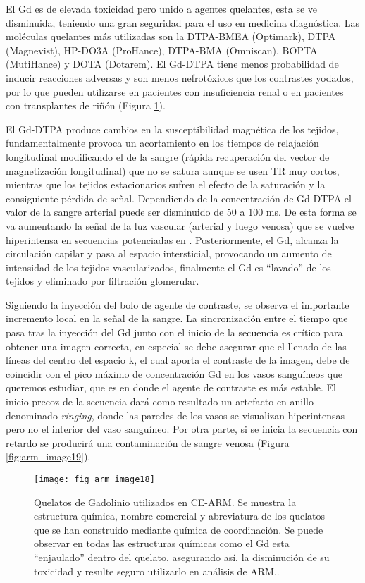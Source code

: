 El Gd es de elevada toxicidad pero unido a agentes quelantes, esta se ve disminuida, teniendo una gran seguridad para el uso en medicina diagnóstica. Las moléculas quelantes más utilizadas son la DTPA-BMEA (Optimark), DTPA (Magnevist), HP-DO3A (ProHance), DTPA-BMA (Omniscan), BOPTA (MutiHance) y DOTA (Dotarem). El Gd-DTPA tiene menos probabilidad de inducir reacciones adversas y son menos nefrotóxicos que los contrastes yodados, por lo que pueden utilizarse en pacientes con insuficiencia renal o en pacientes con transplantes de riñón (Figura \ref{fig:arm_image18}). 


El Gd-DTPA produce cambios en la susceptibilidad magnética de los tejidos, fundamentalmente provoca un acortamiento en los tiempos de relajación longitudinal modificando el \Tone de la sangre (rápida recuperación del vector de magnetización longitudinal) que no se satura aunque se usen TR muy cortos, mientras que los tejidos estacionarios sufren el efecto de la saturación y la consiguiente pérdida de señal. Dependiendo de la concentración de Gd-DTPA el valor \Tone de la sangre arterial puede ser disminuido de 50 a 100 ms. De esta forma se va aumentando la señal de la luz vascular (arterial y luego venosa) que se vuelve hiperintensa en secuencias potenciadas en \Tone. Posteriormente, el Gd, alcanza la circulación capilar y pasa al espacio intersticial, provocando un aumento de intensidad de los tejidos vascularizados, finalmente el Gd es ``lavado'' de los tejidos y eliminado por filtración glomerular. 


Siguiendo la inyección del bolo de agente de contraste, se observa el importante incremento local en la señal de la sangre. La sincronización entre el tiempo que pasa tras la inyección del Gd junto con el inicio de la secuencia es crítico para obtener una imagen correcta, en especial se debe asegurar que el llenado de las líneas del centro del espacio k, el cual aporta el contraste de la imagen, debe de coincidir con el pico máximo de concentración Gd en los vasos sanguíneos que queremos estudiar, que es en donde el agente de contraste es más estable. El inicio precoz de la secuencia dará como resultado un artefacto en anillo denominado \textit{ringing}, donde las paredes de los vasos se visualizan hiperintensas pero no el interior del vaso sanguíneo. Por otra parte, si se inicia la secuencia con retardo se producirá una contaminación de sangre venosa (Figura \ref{fig:arm_image19}). 


\begin{figure}[htbp]
\begin{figg}
 \texttt{[image: fig\_arm\_image18]}
 \caption{
Quelatos de Gadolinio utilizados en CE-ARM. Se muestra la estructura química, nombre comercial y abreviatura de los quelatos que se han construido mediante química de coordinación. Se puede observar en todas las estructuras químicas como el Gd esta ``enjaulado'' dentro del quelato, asegurando así, la disminución de su toxicidad y resulte seguro utilizarlo en análisis de ARM..
 }
 \label{fig:arm_image18}
\end{figg}
\end{figure}


